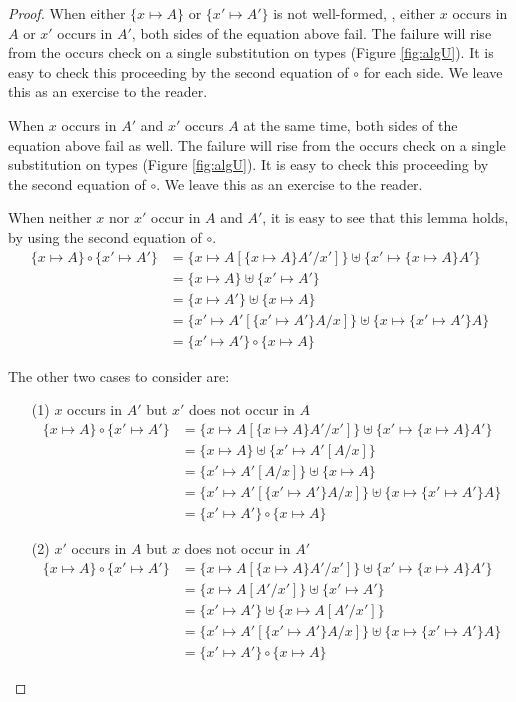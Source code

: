 \begin{proof}
When either $\{x\mapsto A\}$ or $\{x'\mapsto A'\}$ is not well-formed,
\ie, either $x$ occurs in $A$ or $x'$ occurs in $A'$,
both sides of the equation above fail. The failure will rise from
the occurs check on a single substitution on types (Figure \ref{fig:algU}).
It is easy to check this proceeding by the second equation of $\circ$
for each side. We leave this as an exercise to the reader.

When $x$ occurs in $A'$ and $x'$ occurs $A$ at the same time,
both sides of the equation above fail as well. The failure will rise from
the occurs check on a single substitution on types (Figure \ref{fig:algU}).
It is easy to check this proceeding by the second equation of $\circ$.
We leave this as an exercise to the reader.

When neither $x$ nor $x'$ occur in $A$ and $A'$, it is easy to see
that this lemma holds, by using the second equation of $\circ$.
\begin{align*}
\{x\mapsto A\}\circ\{x'\mapsto A'\}
&= \{x\mapsto A[\{x\mapsto A\} A'/x']\}\uplus\{x'\mapsto\{x\mapsto A\} A'\} \\
&= \{x\mapsto A\}\uplus\{x'\mapsto A'\} \\
&= \{x\mapsto A'\}\uplus\{x\mapsto A\} \\
&= \{x'\mapsto A'[\{x'\mapsto A'\}A/x]\}\uplus\{x\mapsto\{x'\mapsto A'\}A\} \\
&= \{x'\mapsto A'\}\circ\{x\mapsto A\}
\end{align*}

The other two cases to consider are:
\begin{itemize}
\item[(1)] $x$ occurs in $A'$ but $x'$ does not occur in $A$
\begin{align*}
\{x\mapsto A\}\circ\{x'\mapsto A'\}
&= \{x\mapsto A[\{x\mapsto A\} A'/x']\}\uplus\{x'\mapsto\{x\mapsto A\} A'\} \\
&= \{x\mapsto A\}\uplus\{x'\mapsto A'[A/x]\} \\
&= \{x'\mapsto A'[A/x]\}\uplus\{x\mapsto A\} \\
&= \{x'\mapsto A'[\{x'\mapsto A'\}A/x]\}\uplus\{x\mapsto\{x'\mapsto A'\}A\} \\
&= \{x'\mapsto A'\}\circ\{x\mapsto A\}
\end{align*}
\item[(2)] $x'$ occurs in $A$ but $x$ does not occur in $A'$
\begin{align*}
\{x\mapsto A\}\circ\{x'\mapsto A'\}
&= \{x\mapsto A[\{x\mapsto A\} A'/x']\}\uplus\{x'\mapsto\{x\mapsto A\} A'\} \\
&= \{x\mapsto A[A'/x']\}\uplus\{x'\mapsto A'\} \\
&= \{x'\mapsto A'\}\uplus\{x\mapsto A[A'/x']\} \\
&= \{x'\mapsto A'[\{x'\mapsto A'\}A/x]\}\uplus\{x\mapsto\{x'\mapsto A'\}A\} \\
&= \{x'\mapsto A'\}\circ\{x\mapsto A\}
\end{align*}
\end{itemize}
\end{proof}

